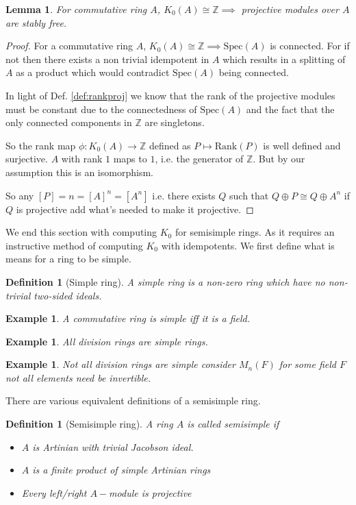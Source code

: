 \documentclass[12pt]{article}
\numberwithin{equation}{section}
\newcommand{\Z}{\mathbb{Z}}
\newcounter{dummy} \numberwithin{dummy}{section}
\newtheorem{definition}[dummy]{Definition}
\newtheorem{lemma}[dummy]{Lemma}
\newtheorem{example}[dummy]{Example}
\begin{document}
	\begin{lemma} For commutative ring $A$, 
		$K_0(A) \cong \Z \implies $ projective modules over $A$ are stably free.
	\end{lemma}
	\begin{proof}
		For a commutative ring $A$, $K_0(A) \cong \Z \implies \mathrm{Spec}(A)$ is connected. For if not then there exists a non trivial idempotent in $A$ which results in a splitting of $A$ as a product which would contradict $\mathrm{Spec}(A)$ being connected.
		
		In light of Def. \ref{def:rankproj} we know that the rank of the projective modules must be constant due to the connectedness of $\mathrm{Spec}(A)$ and the fact that the only connected components in $\Z $ are singletons. 
		
		So the rank map $\phi:K_0(A) \to \Z $ defined as $P \mapsto \mathrm{Rank}(P)$ is well defined and surjective. $A$ with rank $1$ maps to $1$, i.e. the generator of $\Z$. But by our assumption this is an isomorphism.				
		
		So any $[P]=n=[A]^n=[A^n]$ i.e. there exists $Q$ such that $Q\oplus P \cong Q \oplus A^n$ if $Q$ is projective add what's needed to make it projective.
	\end{proof}
	
	We end this section with computing $K_0$ for semisimple rings. As it requires an instructive method of computing $K_0$ with idempotents. We first define what is means for a ring to be simple.
	
	\begin{definition}[Simple ring]
		A simple ring is a non-zero ring which have no non-trivial two-sided ideals.
	\end{definition}
	\begin{example}
		A commutative ring is simple iff it is a field.
	\end{example}
	\begin{example}
		All division rings are simple rings.
	\end{example}
	\begin{example}
		Not all division rings are simple consider $M_n(F)$ for some field $F$ not all elements need be invertible.
	\end{example}
	
	There are various equivalent definitions of a semisimple ring.
	\begin{definition}[Semisimple ring]
		A ring $A$ is called semisimple if
		\begin{itemize}
			\item $A$ is Artinian with trivial Jacobson ideal.
			\item $A$ is a finite product of simple Artinian rings
			\item Every left/right $A-$module is projective
		\end{itemize}
	\end{definition}
	
\end{document}
